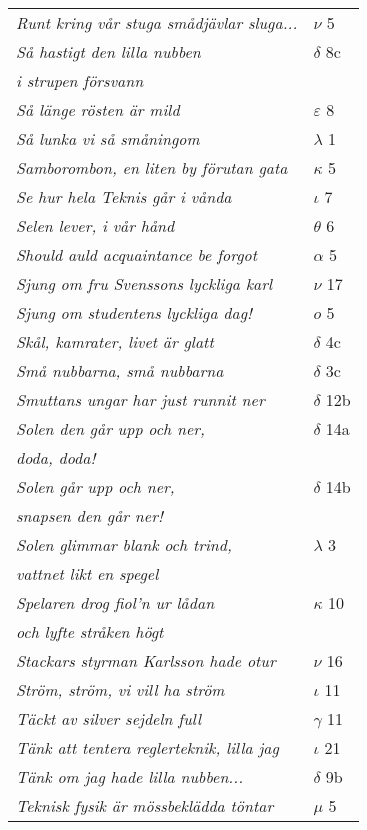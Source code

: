 \documentclass[a6paper,10pt]{article}
\begin{document}
\newpage
\begin{table}[!h]
\begin{tabular}{l l}
\textit{Runt kring vår stuga smådjävlar sluga...}	&$\nu$ 5\\
\textit{Så hastigt den lilla nubben}	&$\delta$ 8c\\
\textit{i strupen försvann} &\\
\textit{Så länge rösten är mild}	&$\varepsilon$ 8\\
\textit{Så lunka vi så småningom}	&$\lambda$ 1\\
\textit{Samborombon, en liten by förutan gata}	&$\kappa$ 5\\
\textit{Se hur hela Teknis går i vånda}	&$\iota$ 7\\
\textit{Selen lever, i vår hånd}	&$\theta$ 6\\
\textit{Should auld acquaintance be forgot}	&$\alpha$ 5\\
\textit{Sjung om fru Svenssons lyckliga karl}	&$\nu$ 17\\
\textit{Sjung om studentens lyckliga dag!}	&$o$ 5\\
\textit{Skål, kamrater, livet är glatt}	&$\delta$ 4c\\
\textit{Små nubbarna, små nubbarna}	&$\delta$ 3c\\
\textit{Smuttans ungar har just runnit ner}	&$\delta$ 12b\\
\textit{Solen den går upp och ner,}	&$\delta$ 14a\\
\textit{doda, doda!} &\\
\textit{Solen går upp och ner,}	&$\delta$ 14b\\
\textit{snapsen den går ner!} &\\
\textit{Solen glimmar blank och trind,}	&$\lambda$ 3\\
\textit{vattnet likt en spegel} &\\
\textit{Spelaren drog fiol'n ur lådan}	&$\kappa$ 10\\
\textit{och lyfte stråken högt} &\\
\textit{Stackars styrman Karlsson hade otur}	&$\nu$ 16\\
\textit{Ström, ström, vi vill ha ström}	&$\iota$ 11\\
\textit{Täckt av silver sejdeln full}	&$\gamma$ 11\\
\textit{Tänk att tentera reglerteknik, lilla jag}&$\iota$ 21\\
\textit{Tänk om jag hade lilla nubben...}	&$\delta$ 9b\\
\textit{Teknisk fysik är mössbeklädda töntar}	&$\mu$ 5\\
\end{tabular}
\end{table}
\end{document}
